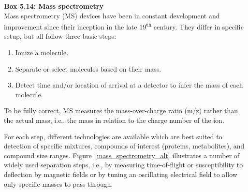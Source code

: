 \begin{framed}
\textbf{Box 5.14: Mass spectrometry}\\
Mass spectrometry (MS) devices have been in constant development and
improvement since their inception in the late 19\textsuperscript{th} century.  They
differ in specific setup, but all follow three basic steps:

\begin{enumerate}
\item Ionize a molecule.
\item Separate or select molecules based on their mass.
\item Detect time and/or location of arrival at a detector to infer the mass of
each molecule.
\end{enumerate}

To be fully correct, MS measures the mass-over-charge ratio (m/z) rather
than the actual mass, i.e., the mass in relation to the charge number of the
ion.

For each step, different technologies are available which are best suited to
detection of specific mixtures, compounds of interest (proteins, metabolites),
and compound size ranges. Figure~\ref{mass_spectrometry_alt} illustrates a number of widely used
separation steps, i.e., by measuring time-of-flight or susceptibility to
deflection by magnetic fields or by tuning an oscillating electrical field
to allow only specific masses to pass through.

% 


\end{framed}
